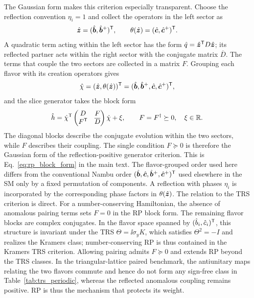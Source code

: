 The Gaussian form makes this criterion especially transparent. Choose the reflection convention $\eta_i=1$ and collect the operators in the left sector as
\begin{equation}
    \hat{\bm{z}}=(\hat{\bm{b}},\hat{\bm{b}}^+)^{\mathsf{T}},
    \qquad
    \theta(\hat{\bm{z}})=(\hat{\bm{c}},\hat{\bm{c}}^+)^{\mathsf{T}}.
\end{equation}
A quadratic term acting within the left sector has the form $\hat q=\hat{\bm{z}}^{\mathsf{T}} D\hat{\bm{z}}$; its reflected partner acts within the right sector with the conjugate matrix $\overline D$. The terms that couple the two sectors are collected in a matrix $F$. Grouping each flavor with its creation operators gives
\begin{equation}
    \hat\chi=(\hat{\bm{z}},\theta(\hat{\bm{z}}))^{\mathsf{T}}
    = (\hat{\bm{b}},\hat{\bm{b}}^+,\hat{\bm{c}},\hat{\bm{c}}^+)^{\mathsf{T}},
\end{equation}
and the slice generator takes the block form
\begin{equation}
    \hat h=
    \hat\chi^{\mathsf{T}}
    \begin{pmatrix}
        D & F\\
        F^{\mathsf{T}} & \overline D
    \end{pmatrix}
    \hat\chi+\xi,
    \qquad
    F=F^\dagger\succeq0,\quad \xi\in\mathbb R.
    \label{eq:rp_block_sm}
\end{equation}
The diagonal blocks describe the conjugate evolution within the two sectors, while $F$ describes their coupling. The single condition $F\succeq0$ is therefore the Gaussian form of the reflection-positive generator criterion. This is Eq.~\eqref{eq:rp_block_form} in the main text. The flavor-grouped order used here differs from the conventional Nambu order $(\hat{\bm{b}},\hat{\bm{c}},\hat{\bm{b}}^+,\hat{\bm{c}}^+)^{\mathsf{T}}$ used elsewhere in the SM only by a fixed permutation of components. A reflection with phases $\eta_i$ is incorporated by the corresponding phase factors in $\theta(\hat{\bm{z}})$.
The relation to the TRS criterion is direct. For a number-conserving Hamiltonian, the absence of anomalous pairing terms sets $F=0$ in the RP block form. The remaining flavor blocks are complex conjugates. In the flavor space spanned by $(\hat b_i,\hat c_i)^{\mathsf{T}}$, this structure is invariant under the TRS $\Theta=\ii\sigma_y K$, which satisfies $\Theta^2=-I$ and realizes the Kramers class; number-conserving RP is thus contained in the Kramers TRS criterion. Allowing pairing admits $F\succeq0$ and extends RP beyond the TRS classes. In the triangular-lattice paired benchmark, the antiunitary maps relating the two flavors commute and hence do not form any sign-free class in Table~\ref{tab:trs_periodic}, whereas the reflected anomalous coupling remains positive. RP is thus the mechanism that protects its weight.

